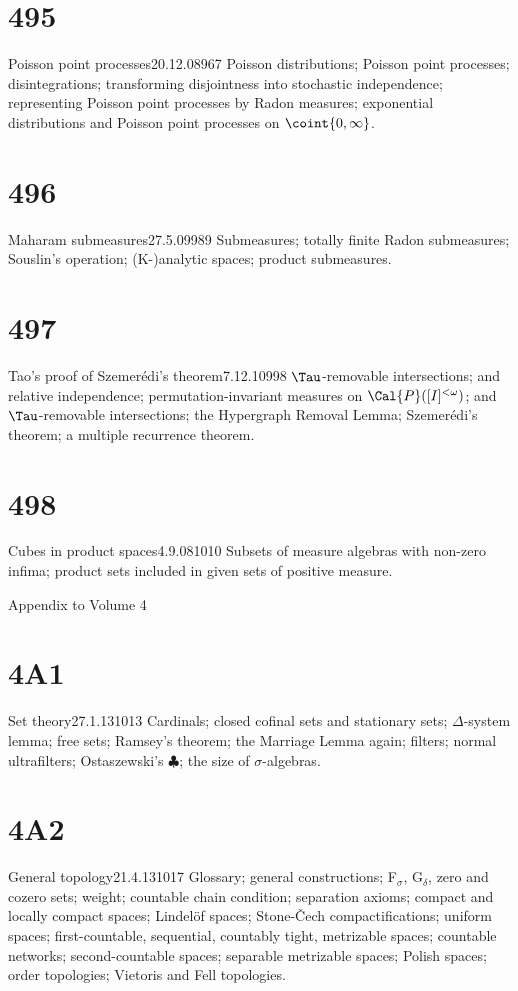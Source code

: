 \section{495}{Poisson point processes}{20.12.08}{967}{}
{Poisson distributions;  Poisson point processes;  disintegrations;
transforming disjointness into stochastic independence;  representing
Poisson point processes by Radon measures;
exponential distributions and Poisson point processes on
$\coint{0,\infty}$.}

\section{496}{Maharam submeasures}{27.5.09}{989}{}
{Submeasures;  totally finite Radon submeasures;  Souslin's operation;
(K-)analytic spaces;  product submeasures.}

\section{497}{Tao's proof of Szemer\'edi's theorem}{7.12.10}{998}{}
{$\Tau$-removable intersections;  and relative independence;
permutation-invariant measures on $\Cal{P}([I]^{<\omega})$;
and $\Tau$-removable intersections;
the Hypergraph Removal Lemma;  Szemer\'edi's theorem;  a multiple
recurrence theorem.}

\section{498}{Cubes in product spaces}{4.9.08}{1010}{}
{Subsets of measure algebras with non-zero infima;  product sets
included in given sets of positive measure.}


Appendix to Volume 4


\section{4A1}{Set theory}{27.1.13}{1013}{}
{Cardinals;  closed cofinal sets and stationary sets;  $\Delta$-system
lemma;  free sets;  Ramsey's theorem;  the Marriage Lemma again;  filters;
normal ultrafilters;  Ostaszewski's $\clubsuit$;
the size of $\sigma$-algebras.}

\section{4A2}{General topology}{21.4.13}{1017}{}
{Glossary;  general constructions;  F$_{\sigma}$, G$_{\delta}$, zero and
cozero sets;  weight;  countable chain condition;
separation axioms;  compact and locally compact spaces;  Lindel\"of
spaces;   Stone-\v{C}ech compactifications;  uniform spaces;
first-{\vthsp}countable, sequential,
countably tight, metrizable spaces;  countable networks;
second-countable spaces;  separable
metrizable spaces;  Polish spaces;  order topologies;  Vietoris and Fell
topologies.}

